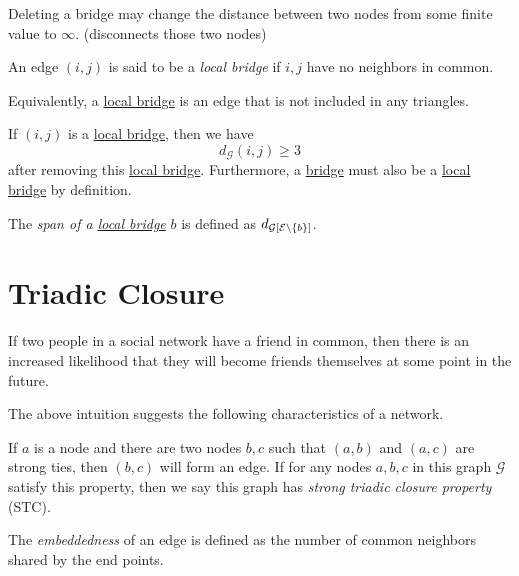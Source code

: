 \begin{remark}
	Deleting a bridge may change the distance between two nodes from some finite value to \(\infty\). (disconnects those two nodes)
\end{remark}

\begin{definition}\label{def:local-bridge}
	An edge \((i, j)\) is said to be a \emph{local bridge} if \(i, j\) have no neighbors in common.
\end{definition}

\begin{note}
	Equivalently, a \hyperref[def:local-bridge]{local bridge} is an edge that is not included in any triangles.
\end{note}

\begin{remark}
	If \((i, j)\) is a \hyperref[def:local-bridge]{local bridge}, then we have
	\[
		d_{\mathcal{G}}(i, j) \geq  3
	\]
	after removing this \hyperref[def:local-bridge]{local bridge}. Furthermore, a \hyperref[def:bridge]{bridge} must also be a
	\hyperref[def:local-bridge]{local bridge} by definition.
\end{remark}

\begin{definition}
	The \emph{span of a \hyperref[def:local-bridge]{local bridge}} \(b\) is defined as \(d_{\mathcal{G}[\mathcal{\MakeUppercase{e}} \setminus \{b\}]}\).
\end{definition}

\section{Triadic Closure}
\begin{intuition}
	If two people in a social network have a friend in common, then there is an increased likelihood that they will become friends themselves at some point in the future.
\end{intuition}

The above intuition suggests the following characteristics of a network.
\begin{definition}\label{def:strong-triadic-closure}
	If \(a\) is a node and there are two nodes \(b, c\) such that \((a, b)\) and \((a, c)\) are strong ties, then \((b, c)\) will form an edge.
	If for any nodes \(a, b, c\) in this graph \(\mathcal{G}\) satisfy this property, then we say this graph has \emph{strong triadic closure property} (STC).
\end{definition}

\begin{definition}[Embeddedness]\label{def:embeddedness}
	The \emph{embeddedness} of an edge is defined as the number of common neighbors shared by the end points.
\end{definition}